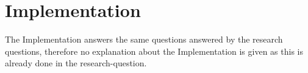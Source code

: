 \hypertarget{implementation}{%
\section{Implementation}\label{implementation}}

The Implementation answers the same questions answered by the research
questions, therefore no explanation about the Implementation is given as
this is already done in the research-question.
